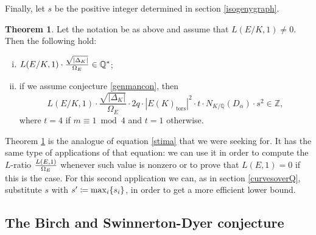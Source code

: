 \documentclass[11pt]{amsart}
\theoremstyle{definition}
\newtheorem{thm}[definizione]{Theorem}
\begin{document}
		Finally, let $s$ be the positive integer determined in section \ref{isogenygraph}. 
			\begin{thm}\label{mainthm}
				Let the notation be as above and assume that $L(E/K,1)\neq 0$. Then the following hold:
				\begin{enumerate}[i)]
				\item ${\displaystyle} L(E/K,1)\cdot\frac{\sqrt{|\Delta_K|}}{\Omega_E}\in {\mathbb{Q}}^*$;
				\item if we assume conjecture \ref{genmancon}, then
				$$L(E/K,1)\cdot \frac{\sqrt{|\Delta_K|}}{\Omega_E}\cdot 2q\cdot |E(K)_{\text{tors}}|^2\cdot  t\cdot N_{K/{\mathbb{Q}}}(D_{\alpha})\cdot s^2\in {\mathbb{Z}},$$
				where $t=4$ if $m\equiv 1 \bmod 4$ and $t=1$ otherwise.
				\end{enumerate}
		\end{thm}
		Theorem \ref{mainthm} is the analogue of equation \ref{stima} that we were seeking for. It has the same type of applications of that equation: we can use it in order to compute the $L$-ratio ${\displaystyle} \frac{L(E,1)}{\Omega_E}$ whenever such value is nonzero or to prove that $L(E,1)=0$ if this is the case. For this second application we can, as in section \ref{curvesoverQ}, substitute $s$ with ${\displaystyle} s'\coloneqq \max_i\{s_i\}$, in order to get a more efficient lower bound.
		\subsection{The Birch and Swinnerton-Dyer conjecture}
\end{document}
